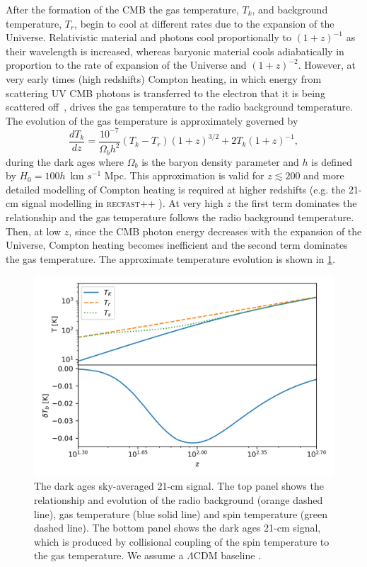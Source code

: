 After the formation of the CMB the gas temperature, $T_k$, and background temperature, $T_r$, begin to cool at different rates due to the expansion of the Universe. Relativistic material and photons cool proportionally to $(1+z)^{-1}$ as their wavelength is increased, whereas baryonic material cools adiabatically in proportion to the rate of expansion of the Universe and $(1+z)^{-2}$. However, at very early times (high redshifts) Compton heating, in which energy from scattering UV CMB photons is transferred to the electron that it is being scattered off~\cite{Furlanetto_IGM_Temp_2006}, drives the gas temperature to the radio background temperature. The evolution of the gas temperature is approximately governed by
\begin{equation}
    \frac{dT_k}{dz} = \frac{10^{-7}}{\Omega_b h^2} (T_k - T_r) (1+z)^{3/2} + 2 T_k (1+z)^{-1},
\end{equation}
during the dark ages where $\Omega_b$ is the baryon density parameter and $h$ is defined by $H_0 = 100 h $~km $s^{-1}$ Mpc. This approximation is valid for $z \lesssim 200$ and more detailed modelling of Compton heating is required at higher redshifts (e.g. the 21-cm signal modelling in \textsc{recfast++} \cite{recfast}). At very high $z$ the first term dominates the relationship and the gas temperature follows the radio background temperature. Then, at low $z$, since the CMB photon energy decreases with the expansion of the Universe, Compton heating becomes inefficient and the second term dominates the gas temperature. The approximate temperature evolution is shown in \cref{fig:dark_ages}.

\begin{figure}
    \centering
    \includegraphics{introduction/figs/example_signal_planck_params.png}
    \caption{The dark ages sky-averaged 21-cm signal. The top panel shows the relationship and evolution of the radio background (orange dashed line), gas temperature (blue solid line) and spin temperature (green dashed line). The bottom panel shows the dark ages 21-cm signal, which is produced by collisional coupling of the spin temperature to the gas temperature. We assume a $\Lambda$CDM baseline \cite{Planck2018}.}
    \label{fig:dark_ages}
\end{figure}

